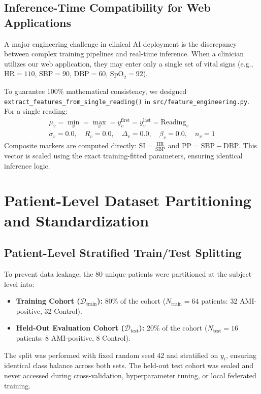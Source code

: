 \documentclass[12pt,a4paper,oneside]{report}
\begin{document}
\subsection{Inference-Time Compatibility for Web Applications}
\label{subsec:inference_compat}

A major engineering challenge in clinical AI deployment is the discrepancy between complex training pipelines and real-time inference. When a clinician utilizes our web application, they may enter only a single set of vital signs (e.g., $\text{HR} = 110$, $\text{SBP} = 90$, $\text{DBP} = 60$, $\text{SpO}_2 = 92$).

To guarantee 100\% mathematical consistency, we designed \texttt{extract\_features\_from\_single\_reading()} in \texttt{src/feature\_engineering.py}. For a single reading:
\begin{align*}
\mu_v = \min_v = \max_v = y_v^{\text{first}} = y_v^{\text{last}} = \text{Reading}_v \\
\sigma_v = 0.0, \quad R_v = 0.0, \quad \Delta_v = 0.0, \quad \beta_v = 0.0, \quad n_v = 1
\end{align*}
Composite markers are computed directly: $\text{SI} = \frac{\text{HR}}{\text{SBP}}$ and $\text{PP} = \text{SBP} - \text{DBP}$. This vector is scaled using the exact training-fitted parameters, ensuring identical inference logic.

\section{Patient-Level Dataset Partitioning and Standardization}
\label{sec:dataset_partitioning}

\subsection{Patient-Level Stratified Train/Test Splitting}
\label{subsec:stratified_split}

To prevent data leakage, the 80 unique patients were partitioned at the subject level into:
\begin{itemize}
    \item \textbf{Training Cohort ($\mathcal{D}_{\text{train}}$):} 80\% of the cohort ($N_{\text{train}} = 64$ patients: 32 AMI-positive, 32 Control).
    \item \textbf{Held-Out Evaluation Cohort ($\mathcal{D}_{\text{test}}$):} 20\% of the cohort ($N_{\text{test}} = 16$ patients: 8 AMI-positive, 8 Control).
\end{itemize}
The split was performed with fixed random seed 42 and stratified on $y_i$, ensuring identical class balance across both sets. The held-out test cohort was sealed and never accessed during cross-validation, hyperparameter tuning, or local federated training.
\end{document}
